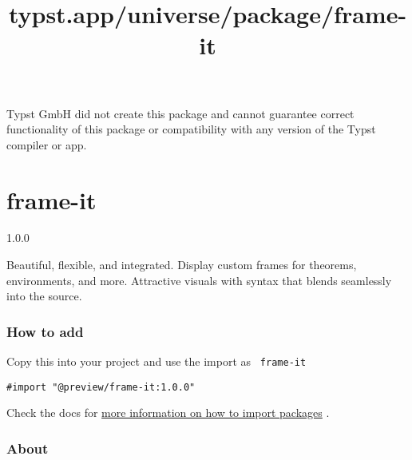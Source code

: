 Typst GmbH did not create this package and cannot guarantee correct
functionality of this package or compatibility with any version of the
Typst compiler or app.


\title{typst.app/universe/package/frame-it}

\label{banner}
\section{frame-it}\label{frame-it}

{ 1.0.0 }

Beautiful, flexible, and integrated. Display custom frames for theorems,
environments, and more. Attractive visuals with syntax that blends
seamlessly into the source.

\label{readme}
\pandocbounded{}

\subsubsection{How to add}\label{how-to-add}

Copy this into your project and use the import as \texttt{\ frame-it\ }

\begin{verbatim}
#import "@preview/frame-it:1.0.0"
\end{verbatim}



Check the docs for
\href{https://typst.app/docs/reference/scripting/\#packages}{more
information on how to import packages} .

\subsubsection{About}\label{about}

